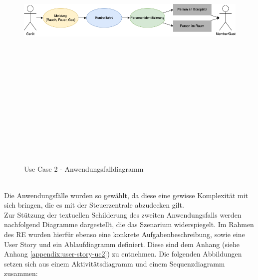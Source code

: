     \begin{figure}[hbt!]
        \centering
        \includegraphics[width=15cm,height=15cm,keepaspectratio]{images/UC2_Diagramm_Notfall.png}
        \caption{Use Case 2 - Anwendungsfalldiagramm}
        \label{fig:uc2-emergency}
    \end{figure}
    \\
    Die Anwendungsfälle wurden so gewählt, da diese eine gewisse Komplexität mit sich bringen, die es mit der Steuerzentrale 
    abzudecken gilt.
    \\
    \linebreak
    Zur Stützung der textuellen Schilderung des zweiten Anwendungsfalls werden nachfolgend Diagramme dargestellt, die das Szenarium 
    widerspiegelt. Im Rahmen des \acs{RE} wurden hierfür ebenso eine konkrete Aufgabenbeschreibung, sowie eine User Story und ein Ablaufdiagramm definiert. Diese sind dem 
    Anhang (siehe Anhang \ref{appendix:user-story-uc2}) zu entnehmen. Die folgenden Abbildungen setzen sich aus einem 
    Aktivitätsdiagramm und einem Sequenzdiagramm zusammen: %
    